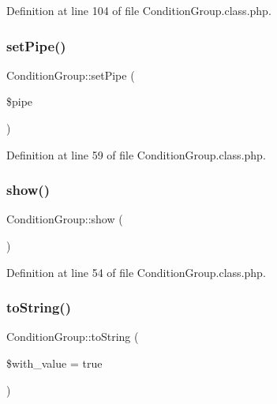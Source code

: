 Definition at line 104 of file Condition\+Group.\+class.\+php.

\hypertarget{classConditionGroup_aa87eb83d1a7546a3db1cf2faf09a8960}{}\label{classConditionGroup_aa87eb83d1a7546a3db1cf2faf09a8960} 
\subsubsection{\texorpdfstring{set\+Pipe()}{setPipe()}}
{\footnotesize\ttfamily Condition\+Group\+::set\+Pipe (\begin{DoxyParamCaption}\item[{}]{\$pipe }\end{DoxyParamCaption})}



Definition at line 59 of file Condition\+Group.\+class.\+php.

\hypertarget{classConditionGroup_a1c58d26f63d47b3a7b6a221f7dc31fc5}{}\label{classConditionGroup_a1c58d26f63d47b3a7b6a221f7dc31fc5} 
\subsubsection{\texorpdfstring{show()}{show()}}
{\footnotesize\ttfamily Condition\+Group\+::show (\begin{DoxyParamCaption}{ }\end{DoxyParamCaption})}



Definition at line 54 of file Condition\+Group.\+class.\+php.

\hypertarget{classConditionGroup_a2c5a734221f4f169a394303a0ac446b1}{}\label{classConditionGroup_a2c5a734221f4f169a394303a0ac446b1} 
\subsubsection{\texorpdfstring{to\+String()}{toString()}}
{\footnotesize\ttfamily Condition\+Group\+::to\+String (\begin{DoxyParamCaption}\item[{}]{\$with\+\_\+value = {\ttfamily true} }\end{DoxyParamCaption})}

